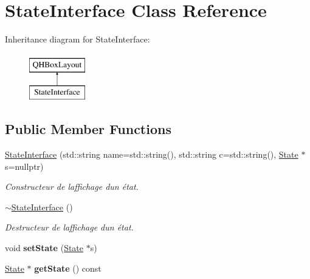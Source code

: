 \hypertarget{class_state_interface}{}\section{State\+Interface Class Reference}
\label{class_state_interface}
Inheritance diagram for State\+Interface\+:\begin{figure}[H]
\begin{center}
\leavevmode
\includegraphics[height=2.000000cm]{class_state_interface}
\end{center}
\end{figure}
\subsection*{Public Member Functions}
\begin{DoxyCompactItemize}
\item 
\mbox{\hyperlink{class_state_interface_a27a39ab128f381cfe12927c08cc9f83e}{State\+Interface}} (std\+::string name=std\+::string(), std\+::string c=std\+::string(), \mbox{\hyperlink{class_state}{State}} $\ast$s=nullptr)
\begin{DoxyCompactList}\small\item\em Constructeur de l\textquotesingle{}affichage d\textquotesingle{}un état. \end{DoxyCompactList}\item 
\mbox{\label{class_state_interface_a39e72885dbe9c56859e3f0521fc2dc29}} 
\mbox{\hyperlink{class_state_interface_a39e72885dbe9c56859e3f0521fc2dc29}{$\sim$\+State\+Interface}} ()
\begin{DoxyCompactList}\small\item\em Destructeur de l\textquotesingle{}affichage d\textquotesingle{}un état. \end{DoxyCompactList}\item 
\mbox{\label{class_state_interface_a621643404147c6de3900bae0b9bfb864}} 
void {\bfseries set\+State} (\mbox{\hyperlink{class_state}{State}} $\ast$s)
\item 
\mbox{\label{class_state_interface_a5286f1ce803ebaacfa131d3a3ecd7024}} 
\mbox{\hyperlink{class_state}{State}} $\ast$ {\bfseries get\+State} () const
\end{DoxyCompactItemize}
